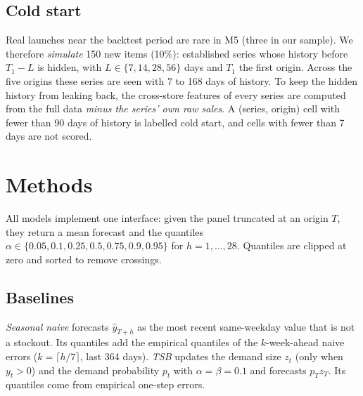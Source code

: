\documentclass[conference]{IEEEtran}
\begin{document}
\subsection{Cold start}
Real launches near the backtest period are rare in M5 (three in our sample). We therefore \emph{simulate} 150 new items (10\%): established series whose history before $T_1-L$ is hidden, with $L\in\{7,14,28,56\}$ days and $T_1$ the first origin. Across the five origins these series are seen with 7 to 168 days of history. To keep the hidden history from leaking back, the cross-store features of every series are computed from the full data \emph{minus the series' own raw sales}. A (series, origin) cell with fewer than 90 days of history is labelled cold start, and cells with fewer than 7 days are not scored.

\section{Methods}
\label{sec:methods}
All models implement one interface: given the panel truncated at an origin $T$, they return a mean forecast and the quantiles $\alpha\in\{0.05,0.1,0.25,0.5,0.75,0.9,0.95\}$ for $h=1,\dots,28$. Quantiles are clipped at zero and sorted to remove crossings.

\subsection{Baselines}
\emph{Seasonal naive} forecasts $\hat y_{T+h}$ as the most recent same-weekday value that is not a stockout. Its quantiles add the empirical quantiles of the $k$-week-ahead naive errors ($k=\lceil h/7\rceil$, last 364 days). \emph{TSB} updates the demand size $z_t$ (only when $y_t>0$) and the demand probability $p_t$ with $\alpha=\beta=0.1$ and forecasts $p_Tz_T$. Its quantiles come from empirical one-step errors.
\end{document}
